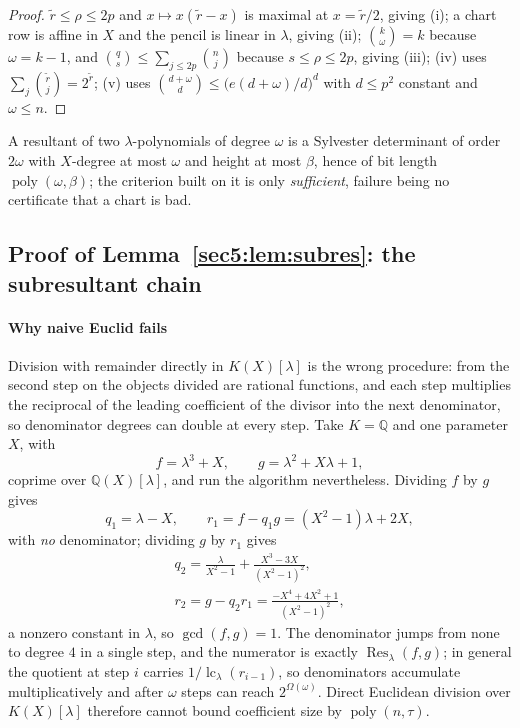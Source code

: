 \documentclass[journal]{IEEEtran}
\theoremstyle{plainn}
\theoremstyle{remark}
\newcommand{\poly}{\operatorname{poly}}
\begin{document}
\begin{proof}
$\widetilde r\le\rho\le2p$ and $x\mapsto x(\widetilde r-x)$ is maximal at $x=\widetilde r/2$, giving
(i); a chart row is affine in $X$ and the pencil is linear in $\lambda$, giving (ii);
$\binom k\omega=k$ because $\omega=k-1$, and $\binom qs\le\sum_{j\le2p}\binom nj$ because
$s\le\rho\le2p$, giving (iii); (iv) uses $\sum_j\binom{\widetilde r}j=2^{\widetilde r}$; (v) uses
$\binom{d+\omega}d\le\bigl(e(d+\omega)/d\bigr)^{d}$ with $d\le p^{2}$ constant and $\omega\le n$.
\end{proof}

A resultant of two $\lambda$-polynomials of degree $\omega$ is a Sylvester determinant of order
$2\omega$ with $X$-degree at most $\omega$ and height at most $\beta$, hence of bit length
$\poly(\omega,\beta)$; the criterion built on it is only \emph{sufficient}, failure being no certificate
that a chart is bad.

\subsection{Proof of Lemma~\ref{sec5:lem:subres}: the subresultant chain}\label{appBC:sub:subres}

\paragraph{Why naive Euclid fails}\label{appBC:sub:naive}
Division with remainder directly in $K(X)[\lambda]$ is the wrong procedure: from the second step on the
objects divided are rational functions, and each step multiplies the reciprocal of the leading
coefficient of the divisor into the next denominator, so denominator degrees can double at every step.
Take $K=\mathbb{Q}$ and one parameter $X$, with
\[
f=\lambda^{3}+X,\qquad g=\lambda^{2}+X\lambda+1 ,
\]
coprime over $\mathbb{Q}(X)[\lambda]$, and run the algorithm nevertheless. Dividing $f$ by $g$ gives
\[
q_1=\lambda-X,\qquad r_1=f-q_1g=(X^{2}-1)\lambda+2X ,
\]
with \emph{no} denominator; dividing $g$ by $r_1$ gives
\[
\begin{gathered}
q_2=\frac{\lambda}{X^{2}-1}+\frac{X^{3}-3X}{(X^{2}-1)^{2}},\\
r_2=g-q_2r_1=\frac{-X^{4}+4X^{2}+1}{(X^{2}-1)^{2}} ,
\end{gathered}
\]
a nonzero constant in $\lambda$, so $\gcd(f,g)=1$. The denominator jumps from none to degree $4$ in a
single step, and the numerator is exactly $\operatorname{Res}_\lambda(f,g)$; in general the quotient at
step $i$ carries $1/\operatorname{lc}_\lambda(r_{i-1})$, so denominators accumulate multiplicatively and
after $\omega$ steps can reach $2^{\Omega(\omega)}$. Direct Euclidean division over $K(X)[\lambda]$
therefore cannot bound coefficient size by $\poly(n,\tau)$.
\end{document}
